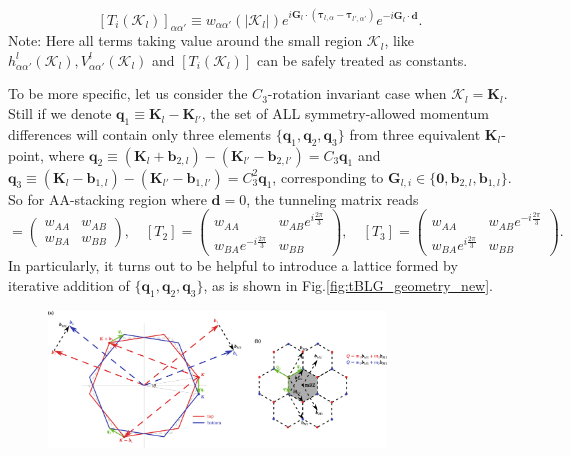 \begin{enumerate}
          \begin{equation}\label{eq:tunneling_matrix_at_high_symmetry_point}
              [T_i(\bm{\mathcal K}_l)]_{\alpha\alpha'}\equiv w_{\alpha\alpha'}(|\bm{\mathcal K}_l|)e^{i\bm G_l\cdot(\bm\tau_{l,\alpha}-\bm\tau_{l',\alpha'})}e^{-i\bm G_l\cdot\bm d}.
          \end{equation}
          Note: Here all terms taking value around the small region $\bm{\mathcal K}_l$, like $h_{\alpha\alpha'}^l(\bm{\mathcal K}_l), V_{\alpha\alpha'}^l(\bm{\mathcal K}_l)$ and $[T_i(\bm{\mathcal K}_l)]$ can be safely treated as constants.

          To be more specific, let us consider the $C_3$-rotation invariant case when $\bm{\mathcal K}_l=\bm K_l$. Still if we denote $\bm q_1\equiv\bm K_l-\bm K_{l'}$, the set of ALL symmetry-allowed momentum differences will contain only three elements $\{\bm q_1,\bm q_2,\bm q_3\}$ from three equivalent $\bm K_l$-point, where $\bm q_2\equiv(\bm K_l+\bm b_{2,l})-(\bm K_{l'}-\bm b_{2,l'})=C_3\bm q_1$ and $\bm q_3\equiv(\bm K_l-\bm b_{1,l})-(\bm K_{l'}-\bm b_{1,l'})=C_3^2\bm q_1$, corresponding to $\bm G_{l,i}\in\{\bm 0,\bm b_{2,l},\bm b_{1,l}\}$. So for AA-stacking region where $\bm d=0$, the tunneling matrix reads
          \begin{equation*}
              [T_1]=\begin{pmatrix}
                  w_{AA} & w_{AB} \\
                  w_{BA} & w_{BB}
              \end{pmatrix},\quad [T_2]=\begin{pmatrix}
                  w_{AA}                     & w_{AB}e^{i\frac{2\pi}{3}} \\
                  w_{BA}e^{-i\frac{2\pi}{3}} & w_{BB}
              \end{pmatrix},\quad [T_3]=\begin{pmatrix}
                  w_{AA}                    & w_{AB}e^{-i\frac{2\pi}{3}} \\
                  w_{BA}e^{i\frac{2\pi}{3}} & w_{BB}
              \end{pmatrix}.
          \end{equation*}
          In particularly, it turns out to be helpful to introduce a lattice formed by iterative addition of $\{\bm q_1,\bm q_2,\bm q_3\}$, as is shown in Fig.\ref{fig:tBLG_geometry_new}.
          \begin{figure}[!htp]
              \centering
              \includegraphics[width=0.8\textwidth]{figures/tBLG_geometry_new.pdf}

\end{figure}
\end{enumerate}
